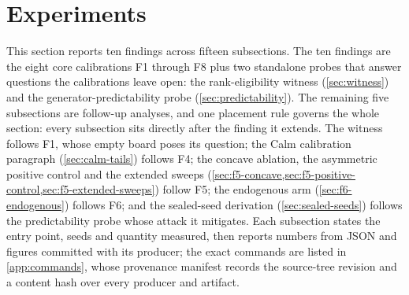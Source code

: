 \section{Experiments}\label{sec:experiments}

This section reports ten findings across fifteen subsections. The ten findings are the eight core calibrations F1 through F8 plus two standalone probes that answer questions the calibrations leave open: the rank-eligibility witness (\cref{sec:witness}) and the generator-predictability probe (\cref{sec:predictability}). The remaining five subsections are follow-up analyses, and one placement rule governs the whole section: every subsection sits directly after the finding it extends. The witness follows F1, whose empty board poses its question; the Calm calibration paragraph (\cref{sec:calm-tails}) follows F4; the concave ablation, the asymmetric positive control and the extended sweeps (\cref{sec:f5-concave,sec:f5-positive-control,sec:f5-extended-sweeps}) follow F5; the endogenous arm (\cref{sec:f6-endogenous}) follows F6; and the sealed-seed derivation (\cref{sec:sealed-seeds}) follows the predictability probe whose attack it mitigates. Each subsection states the entry point, seeds and quantity measured, then reports numbers from JSON and figures committed with its producer; the exact commands are listed in \cref{app:commands}, whose provenance manifest records the source-tree revision and a content hash over every producer and artifact.

